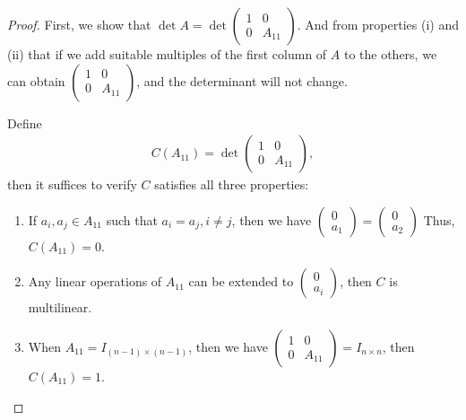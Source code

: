 \documentclass[11pt]{book}
\theoremstyle{definition}
\numberwithin{equation}{chapter}
\begin{document}
\begin{proof}
First, we show that $\det A =\det \left(
    \begin{matrix}
        1 & 0\\
        0 & A_{11}
    \end{matrix}
    \right)$. And from properties (i) and (ii) that if we add suitable multiples of the first column of $A$ to the others, we can obtain $\left(
    \begin{matrix}
        1 & 0\\
        0 & A_{11}
    \end{matrix}
    \right)$, and the determinant will not change.

Define 
\begin{align*}
    C(A_{11}) = \det \left(
    \begin{matrix}
        1 & 0\\
        0 & A_{11}
    \end{matrix}
    \right),
\end{align*}
then it suffices to verify $C$ satisfies all three properties:
\begin{enumerate}[label=(\alph*)]
    \item If $a_i, a_j\in A_{11}$ such that $a_i = a_j, i\neq j$, then we have $\left(
    \begin{matrix}
        0\\
        a_1
    \end{matrix}
    \right) = \left(
    \begin{matrix}
        0\\
        a_2
    \end{matrix}
    \right)$ Thus, $C(A_{11}) = 0$.
    \item Any linear operations of $A_{11}$ can be extended to $\left(
    \begin{matrix}
        0\\
        a_i
    \end{matrix}
    \right)$, then $C$ is multilinear.
    \item When $A_{11} = I_{(n-1)\times(n-1)}$, then we have $\left(
    \begin{matrix}
        1 & 0\\
        0 & A_{11}
    \end{matrix}
    \right) = I_{n\times n}$, then $C(A_{11}) = 1$.
\end{enumerate}
\end{proof}
\end{document}

